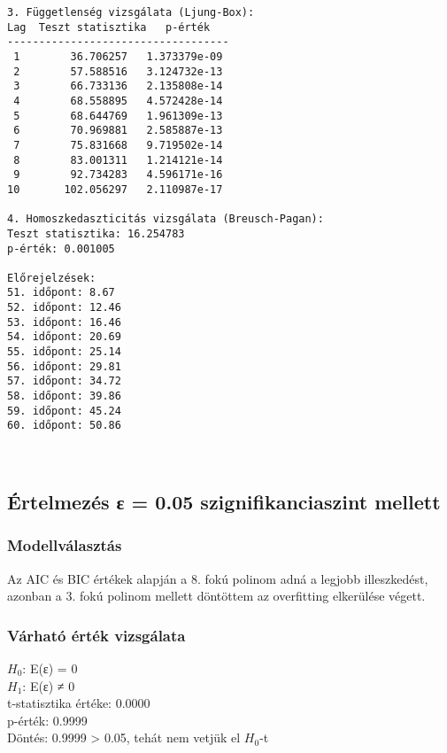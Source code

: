 \documentclass[11pt]{article}
\begin{document}
\begin{Verbatim}[commandchars=\\\{\}]
3. Függetlenség vizsgálata (Ljung-Box):
Lag  Teszt statisztika   p-érték
-----------------------------------
 1        36.706257   1.373379e-09
 2        57.588516   3.124732e-13
 3        66.733136   2.135808e-14
 4        68.558895   4.572428e-14
 5        68.644769   1.961309e-13
 6        70.969881   2.585887e-13
 7        75.831668   9.719502e-14
 8        83.001311   1.214121e-14
 9        92.734283   4.596171e-16
10       102.056297   2.110987e-17

4. Homoszkedaszticitás vizsgálata (Breusch-Pagan):
Teszt statisztika: 16.254783
p-érték: 0.001005

Előrejelzések:
51. időpont: 8.67
52. időpont: 12.46
53. időpont: 16.46
54. időpont: 20.69
55. időpont: 25.14
56. időpont: 29.81
57. időpont: 34.72
58. időpont: 39.86
59. időpont: 45.24
60. időpont: 50.86
    \end{Verbatim}

    \begin{center}
    \end{center}
    { \hspace*{\fill} \\}
    
    \subsection{Értelmezés ε = 0.05 szignifikanciaszint
mellett}\label{uxe9rtelmezuxe9s-ux3b5-0.05-szignifikanciaszint-mellett}

\subsubsection{Modellválasztás}\label{modellvuxe1lasztuxe1s}

Az AIC és BIC értékek alapján a 8. fokú polinom adná a legjobb
illeszkedést, azonban a 3. fokú polinom mellett döntöttem az overfitting
elkerülése végett.

\subsubsection{Várható érték
vizsgálata}\label{vuxe1rhatuxf3-uxe9rtuxe9k-vizsguxe1lata}

$H_0$: E(ε) = 0\\
$H_1$: E(ε) ≠ 0\\
t-statisztika értéke: 0.0000\\
p-érték: 0.9999\\
Döntés: 0.9999 \textgreater{} 0.05, tehát nem vetjük el $H_0$-t
\end{document}
